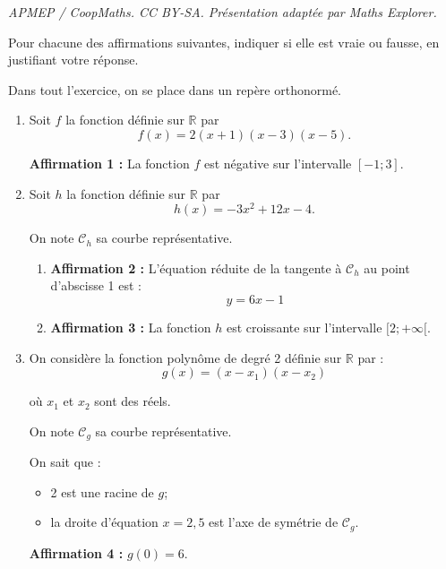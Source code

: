 \documentclass[10pt]{article}
\providecommand{\R}{\mathbb{R}}
\begin{document}
\noindent\textit{APMEP / CoopMaths. CC BY-SA. Présentation adaptée par Maths Explorer.}\par\medskip
Pour chacune des affirmations suivantes, indiquer si elle est vraie ou fausse, en justifiant votre réponse.

	Dans tout l'exercice, on se place dans un repère orthonormé.

	\begin{enumerate}[itemsep=5mm]
		\item Soit $f$ la fonction définie sur $\R$ par \[f(x)=2(x+1)(x-3)(x-5).\]

		\textbf{Affirmation 1 :} La fonction $f$ est négative sur l'intervalle $[-1 ; 3]$.

		\item Soit $h$ la fonction définie sur $\R$ par
		\[h(x)=-3 x^{2}+12 x-4.\]

		On note $\mathcal{C}_{h}$ sa courbe représentative.

		\begin{enumerate}
			\item \textbf{Affirmation 2 :} L'équation réduite de la tangente à $\mathcal{C}_{h}$ au point d'abscisse 1 est :
			\[y=6 x-1\]

			\item \textbf{Affirmation 3 :} La fonction $h$ est croissante sur l'intervalle $[2 ; +\infty[$.
		\end{enumerate}

		\item On considère la fonction polynôme de degré 2 définie sur $\R$ par :
		\[g(x)=\left(x-x_{1}\right)\left(x-x_{2}\right)\]

		où $x_{1}$ et $x_{2}$ sont des réels.

		On note $\mathcal{C}_{g}$ sa courbe représentative.

		On sait que :

		\begin{itemize}[label={\textbullet~}]
			\item 2 est une racine de $g$;
			\item la droite d'équation $x=2,5$ est l'axe de symétrie de $\mathcal{C}_{g}$.
		\end{itemize}

		\textbf{Affirmation 4 :} $g(0)=6$.

	\end{enumerate}
\end{document}
